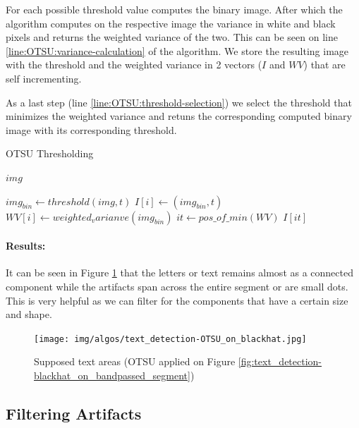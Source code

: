 For each possible threshold value computes the binary image. After which the algorithm computes on the respective image the variance in white and black pixels and returns the weighted variance of the two. This can be seen on line \ref{line:OTSU:variance-calculation} of the algorithm. We store the resulting image with the threshold and the weighted variance in 2 vectors ($I$ and $WV$) that are self incrementing.

As a last step (line \ref{line:OTSU:threshold-selection}) we select the threshold that minimizes the weighted variance and retuns the corresponding computed binary image with its corresponding threshold.

\begin{algorithm}
    \caption{OTSU Thresholding}\label{alg:OTSU-thresholding}
    \begin{algorithmic}[1]
        \Require $img$

            \State $img_{bin} \gets threshold(img, t)$
            \State $I[i] \gets (img_{bin}, t)$
            \State $WV[i] \gets weighted_varianve(img_{bin})$\label{line:OTSU:variance-calculation}
        \EndFor
        \State $it \gets pos\_of\_min(WV)$\label{line:OTSU:threshold-selection}
        \State \Return $I[it]$
    \end{algorithmic}
\end{algorithm}

\paragraph*{Results:}\mbox{}\par
It can be seen in Figure \ref{fig:text_detection-OTSU_on_blackhat} that the letters or text remains almost as a connected component while the artifacts span across the entire segment or are small dots. This is very helpful as we can filter for the components that have a certain size and shape.

\begin{figure}
    \centering
    \texttt{[image: img/algos/text\_detection-OTSU\_on\_blackhat.jpg]}
    \caption{Supposed text areas (OTSU applied on Figure \ref{fig:text_detection-blackhat_on_bandpassed_segment})}
    \label{fig:text_detection-OTSU_on_blackhat}
\end{figure}

\subsection{Filtering Artifacts}

